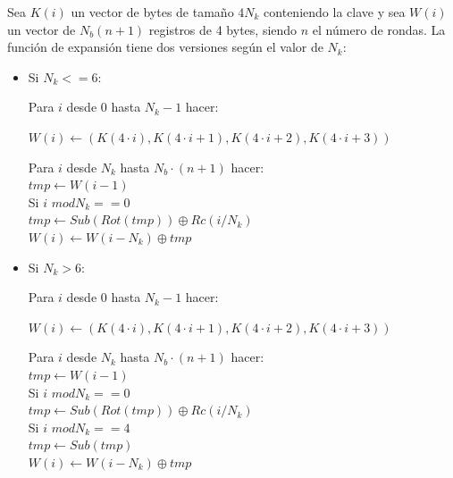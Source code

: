 Sea $K(i)$ un vector de bytes de tamaño $4N_k$ conteniendo la clave y sea $W(i)$ un vector de $N_b(n+1)$ registros de 4 bytes, siendo $n$ el número de rondas. 
La función de expansión tiene dos versiones según el valor de $N_k$:

\begin{itemize}
	\item Si $N_k<=6$:
	\begin{algorithm}
		Para $i$ desde 0 hasta $N_{k}-1$ hacer:
		\begin{description}
			$W(i)\leftarrow(K(4·i), K(4·i+1), K(4·i+2), K(4·i+3))$
		\end{description}
		Para $i$ desde $N_k$ hasta $N_{b}·(n+1)$ hacer:\\
			\hspace*{20}$tmp\leftarrow W(i-1)$\\
			\hspace*{20}Si $i$ $mod N_k == 0$\\
			\hspace*{40}$tmp\leftarrow Sub(Rot(tmp))\oplus Rc(i/N_k)$\\
			\hspace*{20}$W(i)\leftarrow W(i-N_k)\oplus tmp$
	\end{algorithm}

	\item Si $N_k>6$:
	\begin{algorithm}
		Para $i$ desde 0 hasta $N_{k}-1$ hacer:
		\begin{description}
			$W(i)\leftarrow(K(4·i), K(4·i+1), K(4·i+2), K(4·i+3))$
		\end{description}
		Para $i$ desde $N_k$ hasta $N_{b}·(n+1)$ hacer:\\
			\hspace*{20}$tmp\leftarrow W(i-1)$\\
			\hspace*{20}Si $i$ $mod N_k == 0$\\
			\hspace*{40}$tmp\leftarrow Sub(Rot(tmp))\oplus Rc(i/N_k)$\\
			\hspace*{20}Si $i$ $mod N_k == 4$\\
			\hspace*{40}$tmp\leftarrow Sub(tmp)$\\
			\hspace*{20}$W(i)\leftarrow W(i-N_k)\oplus tmp$
	\end{algorithm}
\end{itemize}

